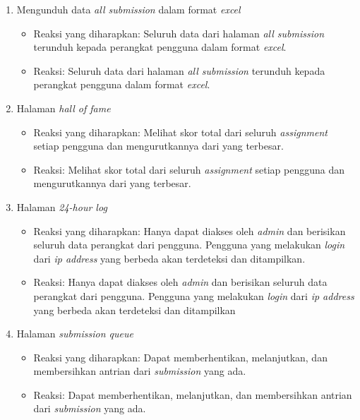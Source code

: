 \begin{enumerate}
	 \item Mengunduh data \textit{all submission} dalam format \textit{excel}
	 \begin{itemize}
	 	\item Reaksi yang diharapkan: Seluruh data dari halaman \textit{all submission} terunduh kepada perangkat pengguna dalam format \textit{excel}.
	 	\item Reaksi: Seluruh data dari halaman \textit{all submission} terunduh kepada perangkat pengguna dalam format \textit{excel}.
	 \end{itemize}
	 \item Halaman \textit{hall of fame}
	 \begin{itemize}
	 	\item Reaksi yang diharapkan: Melihat skor total dari seluruh \textit{assignment} setiap pengguna dan mengurutkannya dari yang terbesar.
	 	\item Reaksi: Melihat skor total dari seluruh \textit{assignment} setiap pengguna dan mengurutkannya dari yang terbesar.
	 \end{itemize}
	 \item Halaman \textit{24-hour log}
	 \begin{itemize}
	 	\item Reaksi yang diharapkan: Hanya dapat diakses oleh \textit{admin} dan berisikan seluruh data perangkat dari pengguna. Pengguna yang melakukan \textit{login} dari \textit{ip address} yang berbeda akan terdeteksi dan ditampilkan.
	 	\item Reaksi: Hanya dapat diakses oleh \textit{admin} dan berisikan seluruh data perangkat dari pengguna. Pengguna yang melakukan \textit{login} dari \textit{ip address} yang berbeda akan terdeteksi dan ditampilkan
	 \end{itemize}
	 \item Halaman \textit{submission queue}
	 \begin{itemize}
	 	\item Reaksi yang diharapkan: Dapat memberhentikan, melanjutkan, dan membersihkan antrian dari \textit{submission} yang ada.
	 	\item Reaksi: Dapat memberhentikan, melanjutkan, dan membersihkan antrian dari \textit{submission} yang ada.
	 \end{itemize}
\end{enumerate}